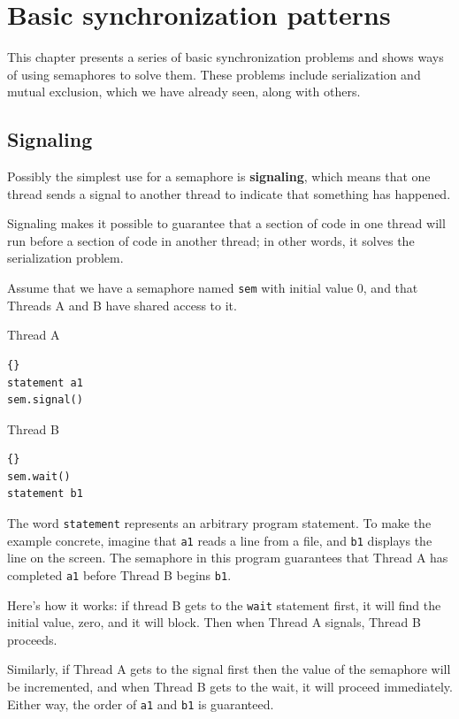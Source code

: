 \documentclass{book}
\newcommand{\clearemptydoublepage}{\newpage\cleardoublepage}
\begin{document}
\clearemptydoublepage
\chapter{Basic synchronization patterns}

This chapter presents a series of basic synchronization problems and
shows ways of using semaphores to solve them.  These problems include
serialization and mutual exclusion, which we have already seen, along
with others.

\section{Signaling}

Possibly the simplest use for a semaphore is {\bf signaling},
which means that one thread sends a signal to another
thread to indicate that something has happened.

Signaling makes it possible to guarantee
that a section of code in one thread will run before a section of
code in another thread; in other words, it solves the serialization
problem.

Assume that we have a semaphore named {\tt sem} with initial value
0, and that Threads A and B have shared access to it.

\begin{minipage}[t]{2in}
Thread A
\begin{lstlisting}{}
statement a1
sem.signal()
\end{lstlisting}
\end{minipage}
\hfill
\begin{minipage}[t]{2in}
Thread B
\begin{lstlisting}{}
sem.wait()
statement b1
\end{lstlisting}
\end{minipage}

The word {\tt statement} represents an arbitrary program statement.
To make the example concrete, imagine that {\tt a1} reads a line
from a file, and {\tt b1} displays the line on the screen.
The semaphore in this program guarantees that Thread A
has completed {\tt a1} before Thread B begins {\tt b1}.

Here's how it works: if thread B gets to the
{\tt wait} statement first, it will find the initial
value, zero, and it will block.  Then when Thread A signals,
Thread B proceeds.

Similarly, if Thread A gets to the signal first then the
value of the semaphore will be incremented, and when Thread
B gets to the wait, it will proceed immediately.
Either way, the order of {\tt a1} and {\tt b1} is guaranteed.
\end{document}
